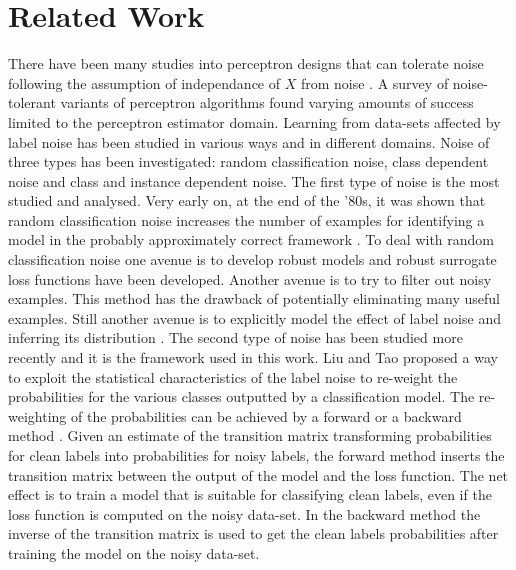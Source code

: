 \documentclass{article} %
\newcommand{\noiseassumption}{assumption of independance of $X$ from noise }
\begin{document}
\section{Related Work}
There have been many studies into perceptron designs that can tolerate noise following the \noiseassumption.
A survey of noise-tolerant variants of perceptron algorithms found varying amounts of success limited to the perceptron estimator domain.
Learning from data-sets affected by label noise has been studied in various ways and in different domains. Noise of three types has been investigated: random classification noise, class dependent noise and class and instance dependent noise. 
The first type of noise is the most studied and analysed. Very early on, at the end of the '80s, it was shown that random classification noise increases the number of examples for identifying a model in the probably approximately correct framework \cite{RCN_PAC}. To deal with random classification noise one avenue is to develop robust models and robust surrogate loss functions have been developed. Another avenue is to try to filter out noisy examples. This method has the drawback of potentially eliminating many useful examples. Still another avenue is to explicitly model the effect of label noise and inferring its distribution \cite{RCN_review}.
The second type of noise has been studied more recently \cite{NoisyLabelsReweighting} and it is the framework used in this work. Liu and Tao proposed a way to exploit the statistical characteristics of the label noise to re-weight the probabilities for the various classes outputted by a classification model.    
The re-weighting of the probabilities can be achieved by a forward or a backward method \cite{Forward}. Given an estimate of the transition matrix transforming probabilities for clean labels into probabilities for noisy labels, the forward method inserts the transition matrix between the output of the model and the loss function. The net effect is to train a model that is suitable for classifying clean labels, even if the loss function is computed on the noisy data-set. In the backward method the inverse of the transition matrix is used to get the clean labels probabilities after training the model on the noisy data-set.    


\end{document}
